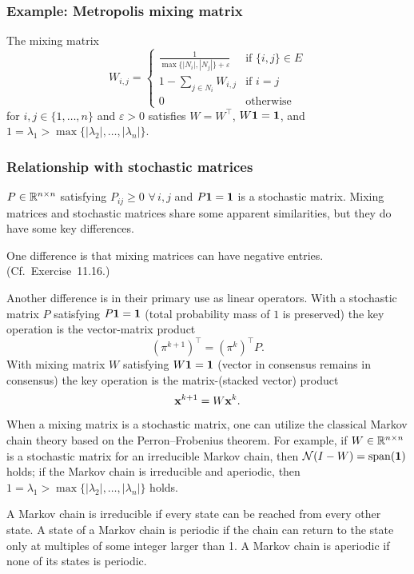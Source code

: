 \documentclass[10pt,mathserif]{beamer}
\begin{document}
\begin{frame}
\frametitle{Example: Metropolis mixing matrix}
The mixing matrix 
\[
W_{i,j}=\left\{
\begin{array}{ll}
\frac{1}{\max\{|N_i|,|N_j|\}+\varepsilon}&\text{if }\{i,j\}\in E\\
1-\sum_{j\in N_i}W_{i,j}&\text{if }{i=j}\\
0&\text{otherwise}
\end{array}
\right.
\]
for $i,j\in \{1,\dots,n\}$ and $\varepsilon>0$ satisfies $W=W^\intercal$, $W{\mathbf{1}}={\mathbf{1}}$, and $1=\lambda_1>\max{\{|\lambda_2|,\dots,|\lambda_n|\}}$.
\end{frame}


\begin{frame}
\frametitle{Relationship with stochastic matrices}
 $P\in \mathbb{R}^{n\times n}$ satisfying $P_{ij}\ge 0$  $\forall\,i,j$ and $P{\mathbf{1}}={\mathbf{1}}$ is a stochastic matrix.
Mixing matrices and stochastic matrices share some apparent similarities, but they do have some key differences.


\medskip

One difference is that mixing matrices can have negative entries. 
(Cf.\ Exercise~11.16.)


\medskip

Another difference is in their primary use as linear operators.
With a stochastic matrix $P$ satisfying $P{\mathbf{1}}={\mathbf{1}}$ (total probability mass of $1$ is preserved) the key operation is the vector-matrix product
\[
(\pi^{k+1})^\intercal=(\pi^k)^\intercal P.
\]
With mixing matrix $W$ satisfying $W{\mathbf{1}}={\mathbf{1}}$ (vector in consensus remains in consensus) the key operation is the matrix-(stacked vector) product
\[
{\mathbf{x}}^{k+1}=W{\mathbf{x}}^k.
\]
\end{frame}


\begin{frame}
When a mixing matrix is a stochastic matrix, one can utilize the classical Markov chain theory based on the Perron--Frobenius theorem.
For example, if $W\in \mathbb{R}^{n\times n}$ is a stochastic matrix for an irreducible Markov chain, then $\mathcal{N}(I-W)=\mathrm{span}({\mathbf{1}})$ holds; if the Markov chain is irreducible and aperiodic, then $1=\lambda_1>\max\{|\lambda_2|,\dots,|\lambda_n|\}$ holds.

\vspace{0.2in}
A Markov chain is irreducible if every state can be reached from every other state. A state of a Markov chain is periodic if the chain can return to the state only at multiples of some integer larger than 1. A Markov chain is aperiodic if none of its states is periodic.
\end{frame}
\end{document}
